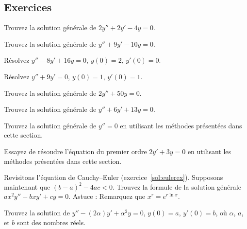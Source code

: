 \subsection{Exercices}

\begin{exercise}
	Trouvez la solution générale de $2y'' + 2y' -4 y = 0$.
\end{exercise}

\begin{exercise}
	Trouvez la solution générale de $y'' + 9y' - 10 y = 0$.
\end{exercise}

\begin{exercise}
	Résolvez $y'' - 8y' + 16 y = 0$, $y(0) = 2$, $y'(0) = 0$.
\end{exercise}

\begin{exercise}
	Résolvez $y'' + 9y' = 0$, $y(0) = 1$, $y'(0) = 1$.
\end{exercise}

\begin{exercise}
	Trouvez la solution générale de $2y'' + 50y = 0$.
\end{exercise}

\begin{exercise}
	Trouvez la solution générale de $y'' + 6 y' + 13 y = 0$.
\end{exercise}

\begin{exercise}
	Trouvez la solution générale de $y'' = 0$ en utilisant les méthodes présentées dans cette section. 
\end{exercise}

\begin{exercise}
	Essayez de résoudre l'équation du premier ordre  
	$2y' + 3y = 0$ en utilisant les méthodes présentées dans cette section. 
\end{exercise}

\begin{exercise}
	Revisitons l'équation de Cauchy--Euler  (exercice~\ref{sol:eulerex}).  Supposons maintenant que ${(b-a)}^2-4ac < 0$.  Trouvez la formule de la solution générale  $a x^2 y'' + b x y' + c y = 0$.  Astuce : Remarquez que $x^r = e^{r \ln x}$.
\end{exercise}

\begin{exercise}
	Trouvez la solution de
	$y''-(2\alpha) y' + \alpha^2 y=0$, $y(0) = a$, $y'(0)=b$,
	où $\alpha$, $a$, et $b$ sont des nombres réels.
\end{exercise}

